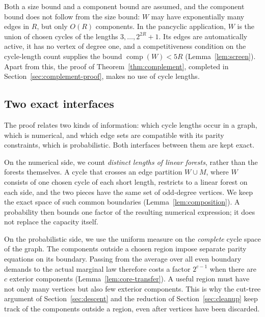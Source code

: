 \documentclass[11pt,a4paper]{article}
\numberwithin{equation}{section}
\theoremstyle{definition}
\theoremstyle{remark}
\newcommand{\cc}{\operatorname{comp}}
\begin{document}
Both a size bound and a component bound are assumed, and the component bound does not follow from the size bound: $W$ may have exponentially many edges in $R$, but only $O(R)$ components. In the pancyclic application, $W$ is the union of chosen cycles of the lengths $3,\ldots,2^{2R}+1$. Its edges are automatically active, it has no vertex of degree one, and a competitiveness condition on the cycle-length count supplies the bound $\cc(W)<5R$ (Lemma~\ref{lem:screen}). Apart from this, the proof of Theorem~\ref{thm:complement}, completed in Section~\ref{sec:complement-proof}, makes no use of cycle lengths.

\subsection{Two exact interfaces}
The proof relates two kinds of information: which cycle lengths occur in a graph, which is numerical, and which edge sets are compatible with its parity constraints, which is probabilistic. Both interfaces between them are kept exact.

On the numerical side, we count \emph{distinct lengths of linear forests}, rather than the forests themselves. A cycle that crosses an edge partition $W\cup M$, where $W$ consists of one chosen cycle of each short length, restricts to a linear forest on each side, and the two pieces have the same set of odd-degree vertices. We keep the exact space of such common boundaries (Lemma~\ref{lem:composition}). A probability then bounds one factor of the resulting numerical expression; it does not replace the capacity itself.

On the probabilistic side, we use the uniform measure on the \emph{complete} cycle space of the graph. The components outside a chosen region impose separate parity equations on its boundary. Passing from the average over all even boundary demands to the actual marginal law therefore costs a factor $2^{c-1}$ when there are $c$ exterior components (Lemma~\ref{lem:core-transfer}). A useful region must have not only many vertices but also few exterior components. This is why the cut-tree argument of Section~\ref{sec:descent} and the reduction of Section~\ref{sec:cleanup} keep track of the components outside a region, even after vertices have been discarded.
\end{document}
